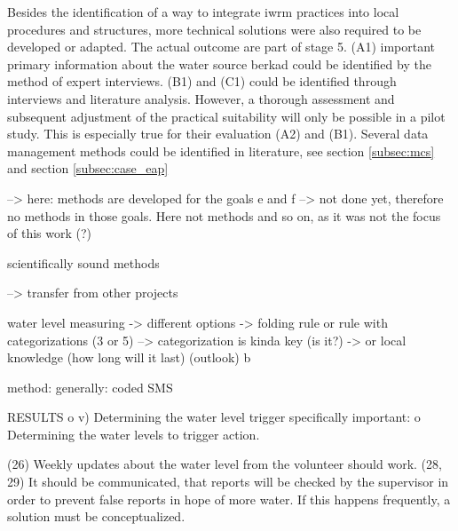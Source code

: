 Besides the identification of a way to integrate \acrshort{iwrm} practices into local procedures and structures, more technical solutions were also required to be developed or adapted. The actual outcome are part of stage 5. (A1) important primary information about the water source berkad could be identified by the method of expert interviews. (B1) and (C1) could be identified through interviews and literature analysis. However, a thorough assessment and subsequent adjustment of the practical suitability will only be possible in a pilot study. This is especially true for their evaluation (A2) and (B1). Several data management methods could be identified in literature, see section \ref*{subsec:mcs} and section \ref{subsec:case_eap}





--> here: methods are developed for the goals e and f --> not done yet, therefore no methods in those goals. Here not methods and so on, as it was not the focus of this work (?)

scientifically sound methods

--> transfer from other projects

water level measuring
-> different options
-> folding rule or rule with categorizations (3 or 5) --> categorization is kinda key (is it?)
-> or local knowledge (how long will it last) (outlook) b

method: generally: coded SMS

RESULTS
o	v) Determining the water level trigger
specifically important:
o	Determining the water levels to trigger action.










(26) Weekly updates about the water level from the volunteer should work.
(28, 29) It should be communicated, that reports will be checked by the supervisor in order to prevent false reports in hope of more water. If this happens frequently, a solution must be conceptualized.





